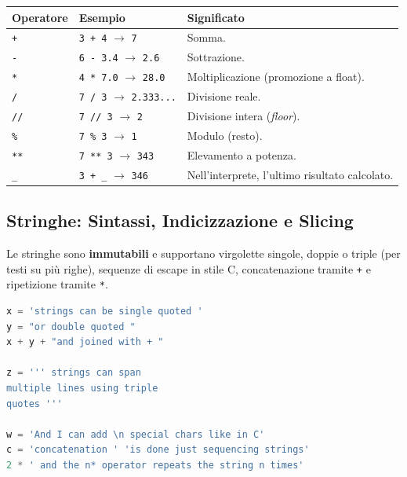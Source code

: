 \documentclass[12pt]{extarticle}
\begin{document}
\begin{center}
\small
\begin{tabular}{p{2.2cm}p{3.2cm}p{8.8cm}}
    \toprule
    \textbf{Operatore} & \textbf{Esempio} & \textbf{Significato} \\
    \midrule
    \texttt{+} & \texttt{3 + 4} $\to$ \texttt{7} & Somma. \\
    \addlinespace
    \texttt{-} & \texttt{6 - 3.4} $\to$ \texttt{2.6} & Sottrazione. \\
    \addlinespace
    \texttt{*} & \texttt{4 * 7.0} $\to$ \texttt{28.0} & Moltiplicazione (promozione a float). \\
    \addlinespace
    \texttt{/} & \texttt{7 / 3} $\to$ \texttt{2.333...} & Divisione reale. \\
    \addlinespace
    \texttt{//} & \texttt{7 // 3} $\to$ \texttt{2} & Divisione intera (\textit{floor}). \\
    \addlinespace
    \texttt{\%} & \texttt{7 \% 3} $\to$ \texttt{1} & Modulo (resto). \\
    \addlinespace
    \texttt{**} & \texttt{7 ** 3} $\to$ \texttt{343} & Elevamento a potenza. \\
    \addlinespace
    \texttt{\_} & \texttt{3 + \_} $\to$ \texttt{346} & Nell'interprete, l'ultimo risultato calcolato. \\
    \bottomrule
\end{tabular}
\end{center}

\subsection{Stringhe: Sintassi, Indicizzazione e Slicing}

\noindent Le stringhe sono \textbf{immutabili} e supportano virgolette singole, doppie o triple (per testi su più righe), sequenze di escape in stile C, concatenazione tramite \texttt{+} e ripetizione tramite \texttt{*}.

\begin{lstlisting}[language=Python]
x = 'strings can be single quoted '
y = "or double quoted "
x + y + "and joined with + "

z = ''' strings can span
multiple lines using triple
quotes '''

w = 'And I can add \n special chars like in C'
c = 'concatenation ' 'is done just sequencing strings'
2 * ' and the n* operator repeats the string n times'
\end{lstlisting}
\end{document}
